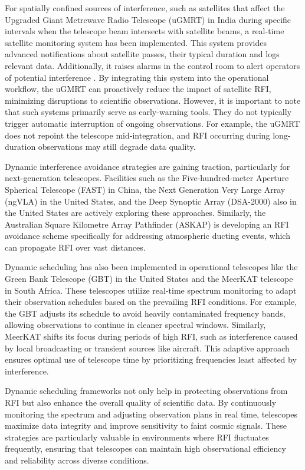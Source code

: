 For spatially confined sources of interference, such as satellites that affect the Upgraded Giant Metrewave Radio Telescope (uGMRT) in India during specific intervals when the telescope beam intersects with satellite beams, a real-time satellite monitoring system has been implemented. This system provides advanced notifications about satellite passes, their typical duration and logs relevant data. Additionally, it raises alarms in the control room to alert operators of potential interference \citep{raybole2016real}. By integrating this system into the operational workflow, the uGMRT can proactively reduce the impact of satellite RFI, minimizing disruptions to scientific observations. However, it is important to note that such systems primarily serve as early-warning tools. They do not typically trigger automatic interruption of ongoing observations. For example, the uGMRT does not repoint the telescope mid-integration, and RFI occurring during long-duration observations may still degrade data quality.

Dynamic interference avoidance strategies are gaining traction, particularly for next-generation telescopes. Facilities such as the Five-hundred-meter Aperture Spherical Telescope (FAST) in China, the Next Generation Very Large Array (ngVLA) in the United States, and the Deep Synoptic Array (DSA-2000) also in the United States are actively exploring these approaches. Similarly, the Australian Square Kilometre Array Pathfinder (ASKAP) is developing an RFI avoidance scheme specifically for addressing atmospheric ducting events, which can propagate RFI over vast distances.

Dynamic scheduling has also been implemented in operational telescopes like the Green Bank Telescope (GBT) in the United States and the MeerKAT telescope in South Africa. These telescopes utilize real-time spectrum monitoring to adapt their observation schedules based on the prevailing RFI conditions. For example, the GBT adjusts its schedule to avoid heavily contaminated frequency bands, allowing observations to continue in cleaner spectral windows. Similarly, MeerKAT shifts its focus during periods of high RFI, such as interference caused by local broadcasting or transient sources like aircraft. This adaptive approach ensures optimal use of telescope time by prioritizing frequencies least affected by interference.

Dynamic scheduling frameworks not only help in protecting observations from RFI but also enhance the overall quality of scientific data. By continuously monitoring the spectrum and adjusting observation plans in real time, telescopes maximize data integrity and improve sensitivity to faint cosmic signals. These strategies are particularly valuable in environments where RFI fluctuates frequently, ensuring that telescopes can maintain high observational efficiency and reliability across diverse conditions.


